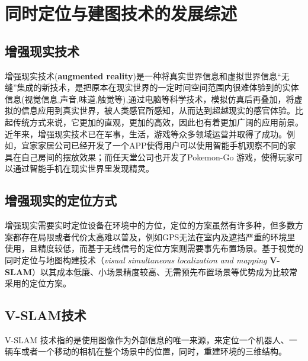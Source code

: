 \chapter{同时定位与建图技术的发展综述}
\section{增强现实技术}
增强现实技术(\textbf{augmented reality})是一种将真实世界信息和虚拟世界信息“无缝”集成的新技术，是把原本在现实世界的一定时间空间范围内很难体验到的实体信息(视觉信息,声音,味道,触觉等),通过电脑等科学技术，模拟仿真后再叠加，将虚拟的信息应用到真实世界，被人类感官所感知，从而达到超越现实的感官体验。比起传统方式来说，它更加的直观，更加的高效，因此也有着更加广阔的应用前景。近年来，增强现实技术已在军事，生活，游戏等众多领域运营并取得了成功。例如，宜家家居公司已经开发了一个APP使得用户可以使用智能手机观察不同的家具在自己房间的摆放效果；而任天堂公司也开发了Pokemon-Go 游戏，使得玩家可以通过智能手机在现实世界里发现精灵。

\section{增强现实的定位方式}
增强现实需要实时定位设备在环境中的方位，定位的方案虽然有许多种，但多数方案都存在局限或者代价太高难以普及，例如GPS无法在室内及遮挡严重的环境里使用，且精度较低，而基于无线信号的定位方案则需要事先布置场景。基于视觉的同时定位与地图构建技术（\textit{visual simultaneous localization and mapping} \textbf{V-SLAM}）以其成本低廉、小场景精度较高、无需预先布置场景等优势成为比较常采用的定位方案。

\section{V-SLAM技术}
V-SLAM 技术指的是使用图像作为外部信息的唯一来源，来定位一个机器人、一辆车或者一个移动的相机在整个场景中的位置，同时，重建环境的三维结构。



